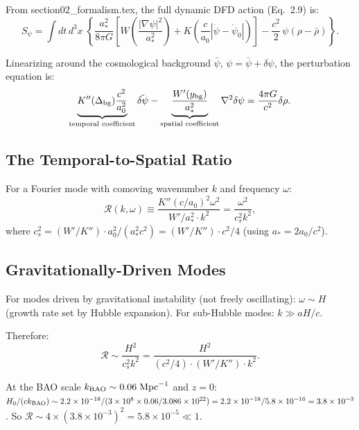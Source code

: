 \documentclass[11pt]{article}
\newcommand{\ee}[1]{\times 10^{#1}}
\begin{document}
From section02\_formalism.tex, the full dynamic DFD action (Eq.~2.9) is:
\begin{equation}
S_\psi = \int dt\,d^3x\;\left\{
  \frac{a_*^2}{8\pi G}\left[
    W\!\left(\frac{|\nabla\psi|^2}{a_*^2}\right)
    + K\!\left(\frac{c}{a_0}|\dot\psi{-}\dot\psi_0|\right)
  \right]
  - \frac{c^2}{2}\,\psi(\rho - \bar\rho)
\right\}.
\end{equation}

Linearizing around the cosmological background $\bar\psi$,
$\psi = \bar\psi + \delta\psi$, the perturbation equation is:
\begin{equation}
\underbrace{K''(\Delta_{\rm bg}) \frac{c^2}{a_0^2}}_{\text{temporal coefficient}}
\ddot{\delta\psi}
- \underbrace{\frac{W'(y_{\rm bg})}{a_*^2}}_{\text{spatial coefficient}}
\nabla^2 \delta\psi
= \frac{4\pi G}{c^2} \delta\rho.
\label{eq:pert-full}
\end{equation}

\subsection{The Temporal-to-Spatial Ratio}

For a Fourier mode with comoving wavenumber $k$ and frequency $\omega$:
\begin{equation}
\mathcal{R}(k,\omega) \equiv
\frac{K''(c/a_0)^2 \omega^2}{W'/a_*^2 \cdot k^2}
= \frac{\omega^2}{c_s^2 k^2},
\end{equation}
where $c_s^2 = (W'/K'') \cdot a_0^2/(a_*^2 c^2)
= (W'/K'') \cdot c^2/4$ (using $a_* = 2a_0/c^2$).

\subsection{Gravitationally-Driven Modes}

For modes driven by gravitational instability (not freely oscillating):
$\omega \sim H$ (growth rate set by Hubble expansion).
For sub-Hubble modes: $k \gg aH/c$.

Therefore:
\begin{equation}
\mathcal{R} \sim \frac{H^2}{c_s^2 k^2}
= \frac{H^2}{(c^2/4) \cdot (W'/K'') \cdot k^2}.
\end{equation}

At the BAO scale $k_{\rm BAO} \sim 0.06\;\text{Mpc}^{-1}$ and $z = 0$:
$H_0/(c k_{\rm BAO}) \sim 2.2\ee{-18}/(3\ee{8} \times 0.06/3.086\ee{22})
= 2.2\ee{-18}/5.8\ee{-16} = 3.8\ee{-3}$.
So $\mathcal{R} \sim 4 \times (3.8\ee{-3})^2 = 5.8\ee{-5} \ll 1$.
\end{document}
